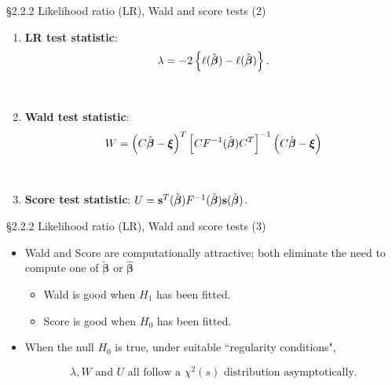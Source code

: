 \documentclass{beamer}
\newenvironment{wideitemize}%
  {\begin{itemize}%
    \setlength{\parskip}{1em}}%
  {\end{itemize}}
\begin{document}
\begin{frame}{\S2.2.2 Likelihood ratio (LR), Wald and score tests (2)}
\begin{enumerate}
\item
\textbf{LR test statistic}:
 \[\lambda=-2\left\{\ell(\tilde{\mbox{\boldmath $\beta$}}) -\ell(\hat{
\mbox{\boldmath $\beta$}})\right\}.
\]
 
\ \
 
%
\item
\textbf{Wald test statistic}: \[W=\left(C\hat{\mbox{\boldmath $\beta$}}-\mbox{\boldmath $\xi$}\right)^T
\left[CF^{-1}(\hat{\mbox{\boldmath $\beta$}})C^T \right]^{-1}
\left(C\hat{\mbox{\boldmath $\beta$}}-\mbox{\boldmath $\xi$}\right)
\] 

\ \

\item
\textbf{Score test statistic}: $U=\textbf{s}^T(\tilde{\mbox{\boldmath $\beta$}})F^{-1}(\tilde{\mbox{\boldmath $\beta$}})
\textbf{s}(\tilde{\mbox{\boldmath $\beta$}})$.
\end{enumerate}

\end{frame}




\begin{frame}{\S2.2.2 Likelihood ratio (LR), Wald and score tests (3)}
\begin{wideitemize}
%


\item Wald and Score are computationally attractive; both eliminate the need to compute one of $\tilde{\boldsymbol \beta}$ or $\hat{\boldsymbol \beta}$ 

\begin{wideitemize}

\item
 Wald is good when $H_1$ has been fitted.
 
 \item Score is good when $H_0$ has been fitted. 
 
 \end{wideitemize}
\item When the null $H_0$ is true, under  suitable ``regularity conditions", 

\[
\lambda, W \text{ and }
U \text{ all follow a } \chi^2(s) \text{ distribution asymptotically.}
\]

\end{wideitemize}

\end{frame}
\end{document}
